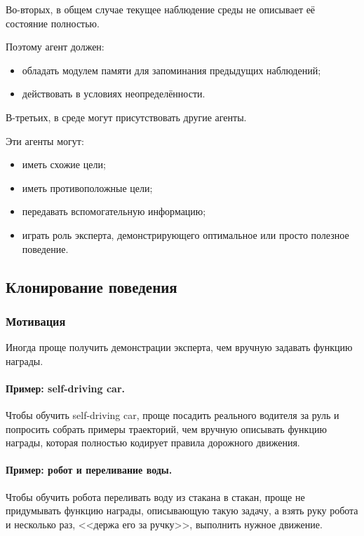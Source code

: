 \documentclass[12pt,a4paper]{article}
\begin{document}
Во-вторых, в общем случае текущее наблюдение среды не описывает её состояние полностью.

Поэтому агент должен:
\begin{itemize}
    \item обладать модулем памяти для запоминания предыдущих наблюдений;
    \item действовать в условиях неопределённости.
\end{itemize}

В-третьих, в среде могут присутствовать другие агенты.

Эти агенты могут:
\begin{itemize}
    \item иметь схожие цели;
    \item иметь противоположные цели;
    \item передавать вспомогательную информацию;
    \item играть роль эксперта, демонстрирующего оптимальное или просто полезное поведение.
\end{itemize}

\subsection{Клонирование поведения}

\subsubsection{Мотивация}

Иногда проще получить демонстрации эксперта, чем вручную задавать функцию награды.

\paragraph{Пример: self-driving car.}

Чтобы обучить self-driving car, проще посадить реального водителя за руль и попросить собрать примеры траекторий, чем вручную описывать функцию награды, которая полностью кодирует правила дорожного движения.

\paragraph{Пример: робот и переливание воды.}

Чтобы обучить робота переливать воду из стакана в стакан, проще не придумывать функцию награды, описывающую такую задачу, а взять руку робота и несколько раз, <<держа его за ручку>>, выполнить нужное движение.
\end{document}
